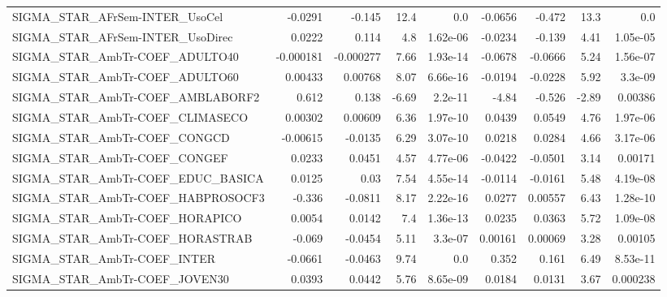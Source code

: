 \begin{tabular}{lrrrrrrrr}
SIGMA\_STAR\_AFrSem-INTER\_UsoCel         &     -0.0291 &       -0.145 &     12.4 &      0.0 &    -0.0656 &      -0.472 &         13.3 &           0.0 \\
SIGMA\_STAR\_AFrSem-INTER\_UsoDirec       &      0.0222 &        0.114 &      4.8 & 1.62e-06 &    -0.0234 &      -0.139 &         4.41 &      1.05e-05 \\
SIGMA\_STAR\_AmbTr-COEF\_ADULTO40         &   -0.000181 &    -0.000277 &     7.66 & 1.93e-14 &    -0.0678 &     -0.0666 &         5.24 &      1.56e-07 \\
SIGMA\_STAR\_AmbTr-COEF\_ADULTO60         &     0.00433 &      0.00768 &     8.07 & 6.66e-16 &    -0.0194 &     -0.0228 &         5.92 &       3.3e-09 \\
SIGMA\_STAR\_AmbTr-COEF\_AMBLABORF2       &       0.612 &        0.138 &    -6.69 &  2.2e-11 &      -4.84 &      -0.526 &        -2.89 &       0.00386 \\
SIGMA\_STAR\_AmbTr-COEF\_CLIMASECO        &     0.00302 &      0.00609 &     6.36 & 1.97e-10 &     0.0439 &      0.0549 &         4.76 &      1.97e-06 \\
SIGMA\_STAR\_AmbTr-COEF\_CONGCD           &    -0.00615 &      -0.0135 &     6.29 & 3.07e-10 &     0.0218 &      0.0284 &         4.66 &      3.17e-06 \\
SIGMA\_STAR\_AmbTr-COEF\_CONGEF           &      0.0233 &       0.0451 &     4.57 & 4.77e-06 &    -0.0422 &     -0.0501 &         3.14 &       0.00171 \\
SIGMA\_STAR\_AmbTr-COEF\_EDUC\_BASICA      &      0.0125 &         0.03 &     7.54 & 4.55e-14 &    -0.0114 &     -0.0161 &         5.48 &      4.19e-08 \\
SIGMA\_STAR\_AmbTr-COEF\_HABPROSOCF3      &      -0.336 &      -0.0811 &     8.17 & 2.22e-16 &     0.0277 &     0.00557 &         6.43 &      1.28e-10 \\
SIGMA\_STAR\_AmbTr-COEF\_HORAPICO         &      0.0054 &       0.0142 &      7.4 & 1.36e-13 &     0.0235 &      0.0363 &         5.72 &      1.09e-08 \\
SIGMA\_STAR\_AmbTr-COEF\_HORASTRAB        &      -0.069 &      -0.0454 &     5.11 &  3.3e-07 &    0.00161 &     0.00069 &         3.28 &       0.00105 \\
SIGMA\_STAR\_AmbTr-COEF\_INTER            &     -0.0661 &      -0.0463 &     9.74 &      0.0 &      0.352 &       0.161 &         6.49 &      8.53e-11 \\
SIGMA\_STAR\_AmbTr-COEF\_JOVEN30          &      0.0393 &       0.0442 &     5.76 & 8.65e-09 &     0.0184 &      0.0131 &         3.67 &      0.000238 \\

\end{tabular}
